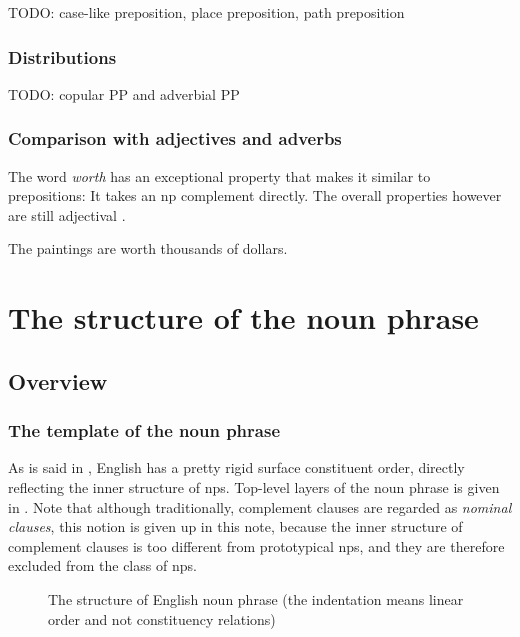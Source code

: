 \documentclass[UTF8, a4paper, oneside, scheme=plain]{ctexrep}
\newcommand*{\citepage}[1]{p.~{#1}}
\newcommand*{\term}[1]{\emph{#1}}
\newcommand{\corpus}[1]{\emph{#1}}
\begin{document}
TODO: case-like preposition, place preposition, path preposition \citet{spatialpp}

\subsection{Distributions}

TODO: copular PP and adverbial PP

\subsection{Comparison with adjectives and adverbs}

The word \corpus{worth} has an exceptional property
that makes it similar to prepositions:
It takes an \acs{np} complement directly.
The overall properties however are still adjectival \citep[\citepage{607}]{cgel}.

\begin{exe}
    \ex The paintings are worth thousands of dollars.
\end{exe}

\chapter{The structure of the noun phrase}\label{chap:np}

\section{Overview}

\subsection{The template of the noun phrase}\label{sec:np.template}

As is said in ,
English has a pretty rigid surface constituent order,
directly reflecting the inner structure of \acs{np}s.
Top-level layers of the noun phrase is given in .
Note that although traditionally, complement clauses are regarded as \term{nominal clauses},
this notion is given up in this note,
because the inner structure of complement clauses is too different from prototypical \acs{np}s,
and they are therefore excluded from the class of \acs{np}s.

\begin{figure}[H]
    \centering
    
    \caption{The structure of English noun phrase (the indentation means linear order and not constituency relations)}
    \label{fig:np-template}
\end{figure}
\end{document}
